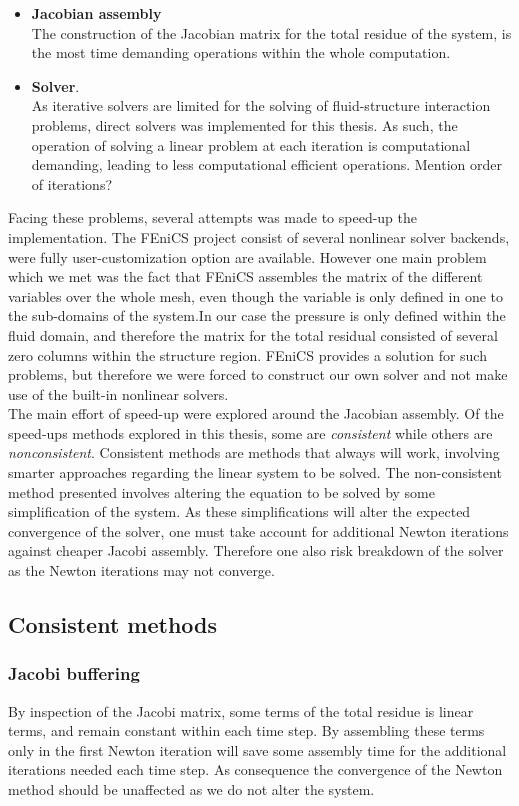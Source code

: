 \begin{itemize}
\item \textbf{Jacobian assembly} \\
The construction of the Jacobian matrix for the total residue of the system, is the most time demanding operations within the whole computation. 
\item \textbf{Solver}. \\ 
As iterative solvers are limited for the solving of fluid-structure interaction problems, direct solvers was implemented for this thesis. As such, the operation of solving a linear problem at each iteration is computational demanding, leading to  less computational efficient operations. Mention order of iterations?
\end{itemize}

Facing these problems, several attempts was made to speed-up the implementation. The FEniCS project consist of several nonlinear solver backends, were fully user-customization option are available. However one main problem which we met was the fact that FEniCS assembles the matrix of the different variables over the whole mesh, even though the variable is only defined in one to the sub-domains of the system.In our case the pressure is only defined within the fluid domain, and therefore the matrix for the total residual consisted of several zero columns within the structure region. FEniCS provides a solution for such problems, but therefore we were forced to construct our own solver and not make use of the built-in nonlinear solvers. \\

The main effort of speed-up were explored around the Jacobian assembly.
Of the speed-ups methods explored in this thesis, some are \textit{consistent} while others are \textit{nonconsistent}. Consistent methods are methods that always will work, involving smarter approaches regarding the linear system to be solved. The non-consistent method presented involves altering the equation to be solved by some simplification of the system. As these simplifications will alter the expected convergence of the solver, one must take account for additional Newton iterations against cheaper Jacobi assembly. Therefore one also risk breakdown of the solver as the Newton iterations may not converge.   


\subsection{Consistent methods}
\subsubsection{Jacobi buffering}
By inspection of the Jacobi matrix, some terms of the total residue is linear terms, and remain constant within each time step. By assembling these terms only in the first Newton iteration will save some assembly time for the additional iterations needed each time step. As consequence the convergence of the Newton method should be unaffected as we do not alter the system.  

